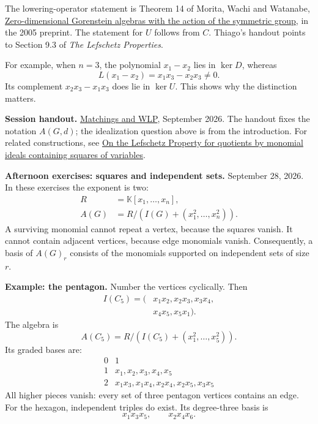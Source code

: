The lowering-operator statement is
Theorem 14 of Morita, Wachi and Watanabe,
\href{https://hdl.handle.net/2115/69582}{%
Zero-dimensional Gorenstein algebras
with the action of the symmetric group},
in the 2005 preprint.
The statement for $U$ follows from $C$.
Thiago's handout points to Section 9.3
of \emph{The Lefschetz Properties}.

For example, when $n=3$, the polynomial
$x_1-x_2$ lies in $\ker D$, whereas
$$
L(x_1-x_2)=x_1x_3-x_2x_3\ne0.
$$
Its complement $x_2x_3-x_1x_3$ does lie
in $\ker U$.
This shows why the distinction matters.

\medskip\noindent
\textbf{Session handout.}
\href{%
https://jornadaslp.github.io/%
jornadas-lp/files/%
problemas-matchings-wlp.pdf%
}{Matchings and WLP}, September 2026.
The handout fixes the notation $A(G,d)$;
the idealization question above is
from the introduction.
For related constructions, see
\href{%
https://arxiv.org/abs/2112.09434%
}{On the Lefschetz Property for quotients
by monomial ideals containing squares
of variables}.

\medskip\noindent
\textbf{Afternoon exercises:
squares and independent sets.}
September 28, 2026.
In these exercises the exponent is two:
$$
\begin{aligned}
R&=\mathbb K[x_1,\ldots,x_n],\\
A(G)&=R/(I(G)+(x_1^2,\ldots,x_n^2)).
\end{aligned}
$$
A surviving monomial cannot repeat a
vertex, because the squares vanish.
It cannot contain adjacent vertices,
because edge monomials vanish.
Consequently, a basis of $A(G)_r$
consists of the monomials supported on
independent sets of size $r$.

\medskip\noindent
\textbf{Example: the pentagon.}
Number the vertices cyclically.
Then
$$
\begin{aligned}
I(C_5)=(&x_1x_2,x_2x_3,x_3x_4,\\
       &x_4x_5,x_5x_1).
\end{aligned}
$$
The algebra is
$$
A(C_5)=
R/(I(C_5)+(x_1^2,\ldots,x_5^2)).
$$
Its graded bases are:
$$
\begin{array}{c|l}
0&1\\
1&x_1,x_2,x_3,x_4,x_5\\
2&x_1x_3,x_1x_4,x_2x_4,x_2x_5,x_3x_5
\end{array}
$$
All higher pieces vanish: every set
of three pentagon vertices contains
an edge.
For the hexagon, independent triples
do exist. Its degree-three basis is
$$
x_1x_3x_5,\qquad x_2x_4x_6.
$$

